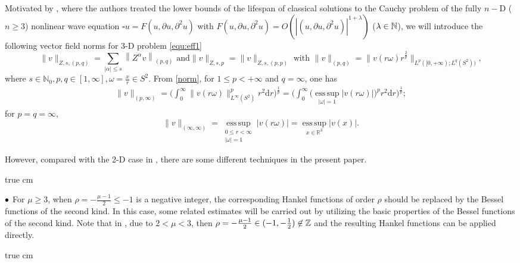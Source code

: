 \documentclass[11pt,twoside]{article}
\newcommand{\N}{\mathbb N}
\newcommand{\p}{\partial}
\newcommand{\f}{\frac}
\theoremstyle{plain}
\theoremstyle{definition}
\theoremstyle{remark}
\numberwithin{equation}{section}
\begin{document}
Motivated by \cite{LX}, where the authors treated the lower bounds
of the lifespan of classical solutions to the Cauchy problem of the fully $n-$D ($n\ge 3$) nonlinear wave equation
$\square u=F(u,\p u, \p^2 u)$ with
$F(u,\p u, \p^2 u)=O(|(u, \p u, \p^2 u)|^{1+\lambda})$ ($\lambda\in\Bbb N$),  we will introduce the following vector field norms
for 3-D problem \eqref{equ:eff1}
\begin{equation}\label{norm}
\text{$\|v\|_{Z, s,(p, q)}=\sum_{|\alpha| \leq s}\left\|Z^\alpha v\right\|_{(p, q)}$ and
$\|v\|_{Z, s, p}=\|v\|_{Z, s,(p, p)}$ with $\|v\|_{(p,q)}=\|v(r \omega) r^{\frac{2}{p}}\|_{L^p([0,+\infty); L^q(S^2))}$},
\end{equation}
where $s\in\N_0, p,q\in[1,\infty], \omega=\f{x}{r}\in S^2$.
From \eqref{norm}, for $1 \le p < +\infty$ and $q = \infty$, one has
\begin{equation}\label{norm2}
\begin{aligned}
\|v\|_{(p, \infty)}
= \big( \int_{0}^{\infty} \big\|v(r\omega)\big\|_{L^{\infty}(S^{2})}^{p} r^{2} \mathrm{d}r \big)^{\frac{1}{p}}
= \big( \int_{0}^{\infty} \big( \operatorname*{ess\,sup}_{|\omega|=1} |v(r\omega)| \big)^{p} r^{2} \mathrm{d}r \big)^{\frac{1}{p}} ;
\end{aligned}
\end{equation}
for $p = q = \infty$,
\begin{equation}\label{norm3}
\|v\|_{(\infty, \infty)}
= \operatorname*{ess\,sup}_{\substack{0\le r<\infty \\ |\omega|=1}} |v(r\omega)|
= \operatorname*{ess\,sup}_{x\in\mathbb{R}^3} |v(x)| .
\end{equation}



However, compared with the 2-D case in \cite{LY}, there are some different techniques in the present paper.

 true cm

${\bf \bullet}$  For $\mu\ge 3$, when $\rho=-\frac{\mu-1}{2}\le -1$ is a negative integer,
the corresponding Hankel functions of order $\rho$ should be replaced by
the Bessel functions of the second kind. In this case, some related estimates will be carried out
by utilizing the basic properties of the Bessel functions of the second kind. Note that in \cite{LY}, due to $2<\mu<3$,
then $\rho=-\frac{\mu-1}{2}\in (-1, -\f12)\not\in\Bbb Z$ and the resulting Hankel functions can be applied directly.


 true cm
\end{document}
